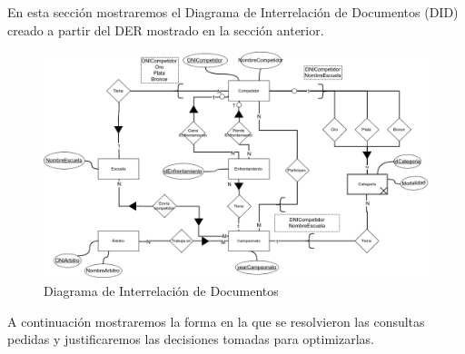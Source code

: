 En esta sección mostraremos el Diagrama de Interrelación de Documentos (DID) creado a partir del DER mostrado en la sección
anterior.

\begin{figure}[H]
  \centering
    \includegraphics[scale=0.4]{imagenes/DID.png}
  \caption{Diagrama de Interrelación de Documentos}
\end{figure}

A continuación mostraremos la forma en la que se resolvieron las consultas pedidas y justificaremos las decisiones
tomadas para optimizarlas.

